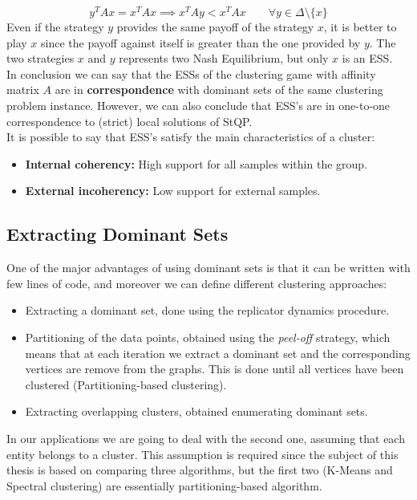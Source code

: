 $$y^TAx = x^TAx \implies x^TAy < x^TAx \qquad \forall y \in \Delta\setminus\{x\}$$
Even if the strategy $y$ provides the same payoff of the strategy $x$, it is better to play $x$ since the payoff against itself is greater than the one provided by $y$. The two strategies $x$ and $y$ represents two Nash Equilibrium, but only $x$ is an ESS.\\
In conclusion we can say that the ESSs of the clustering game with affinity matrix $A$ are in \textbf{correspondence} with dominant sets of the same clustering problem instance. However, we can also conclude that ESS’s are in one-to-one correspondence to (strict) local solutions of StQP.\\
It is possible to say that ESS's satisfy the main characteristics of a cluster:
\begin{itemize}
	\item \textbf{Internal coherency:} High support for all samples within the group.
	\item \textbf{External incoherency:} Low support for external samples.
\end{itemize}


\subsection{Extracting Dominant Sets}
One of the major advantages of using dominant sets is that it can be written with few lines of code, and moreover we can define different clustering approaches:
\begin{itemize}
	\item Extracting a dominant set, done using the replicator dynamics procedure.
	\item Partitioning of the data points, obtained using the \textit{peel-off} strategy, which means that at each iteration we extract a dominant set and the corresponding vertices are remove from the graphs. This is done until all vertices have been clustered (Partitioning-based clustering).
	\item Extracting overlapping clusters, obtained enumerating dominant sets. 
\end{itemize}
In our applications we are going to deal with the second one, assuming that each entity belongs to a cluster. This assumption is required since the subject of this thesis is based on comparing three algorithms, but the first two (K-Means  and Spectral clustering) are essentially partitioning-based algorithm.\\

